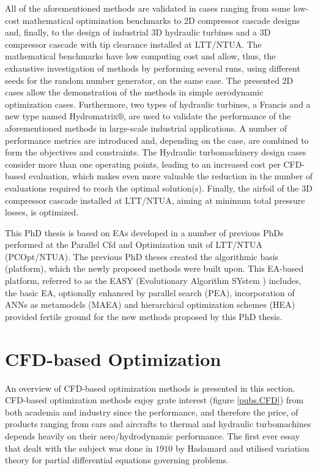 All of the aforementioned methods are validated in cases ranging from  some low-cost mathematical optimization benchmarks to 2D compressor cascade designs and, finally, to the design of industrial 3D hydraulic turbines and a 3D compressor cascade with tip clearance installed at LTT/NTUA. The mathematical benchmarks have low computing cost and allow, thus, the exhaustive investigation of methods by performing several runs, using different seeds for the random number generator, on the same case. The presented 2D cases allow the demonstration of the methods in simple aerodynamic optimization cases. Furthermore, two types of hydraulic turbines, a Francis and a new type named Hydromatrix$\circledR$, are used to validate the performance of the aforementioned methods in large-scale industrial applications. A number of performance metrics are introduced and, depending on the case, are combined to form the objectives and constraints. The Hydraulic turbomachinery design cases consider more than one operating points, leading to an increased cost per CFD-based evaluation, which makes even more valuable the reduction in the number of evaluations required to reach the optimal solution(s).  Finally, the airfoil of the 3D compressor cascade installed at LTT/NTUA, aiming at minimum total pressure losses, is optimized.     


This PhD thesis is based on EAs developed in a number of previous PhDs \cite{phd_Giotis,phd_Karakasis,phd_Kampolis,phd_Vera} performed at the Parallel Cfd and Optimization unit of LTT/NTUA (PCOpt/NTUA). The previous PhD theses created the algorithmic basis (platform),  which the newly proposed methods were built upon. This EA-based platform, referred to as the EASY (Evolutionary Algorithm SYstem \cite{EASYsite}) includes, the basic EA, optionally enhanced by parallel search (PEA), incorporation of ANNs as metamodels (MAEA) and hierarchical optimization schemes (HEA) provided fertile ground for the new methods proposed by this PhD thesis.                       
 

\section{CFD-based Optimization}

An overview of CFD-based optimization methods is presented in this section. CFD-based optimization methods enjoy grate interest (figure \ref{pubs.CFD}) from both academia and industry since the performance, and therefore the price, of products ranging from cars and aircrafts to thermal and hydraulic turbomachines  depends heavily on their aero/hydrodynamic performance. The first ever essay that dealt with the subject was done in $1910$ by Hadamard \cite{Had10} and utilised variation theory for partial differential equations governing problems.   

